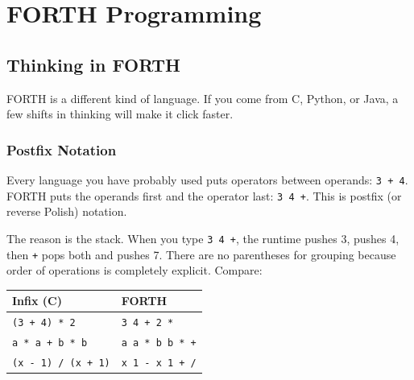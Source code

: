 
\part{FORTH Programming}

\chapter{Thinking in FORTH}
\label{chap:thinking}

FORTH is a different kind of language. If you come from C, Python, or Java, a
few shifts in thinking will make it click faster.

\section{Postfix Notation}
\label{sec:postfix}

Every language you have probably used puts operators between operands:
\texttt{3 + 4}. FORTH puts the operands first and the operator last:
\texttt{3 4 +}. This is postfix (or reverse Polish) notation.

The reason is the stack. When you type \texttt{3 4 +}, the runtime pushes 3,
pushes 4, then \texttt{+} pops both and pushes 7. There are no parentheses
for grouping because order of operations is completely explicit. Compare:

\begin{center}
\begin{tabular}{ll}
\toprule
Infix (C) & FORTH \\
\midrule
\texttt{(3 + 4) * 2} & \texttt{3 4 + 2 *} \\
\texttt{a * a + b * b} & \texttt{a a * b b * +} \\
\texttt{(x - 1) / (x + 1)} & \texttt{x 1 - x 1 + /} \\
\bottomrule
\end{tabular}
\end{center}

